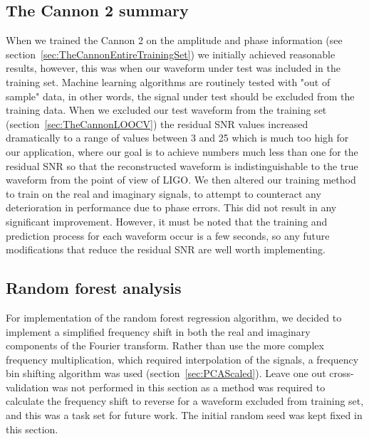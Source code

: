 \subsection{The Cannon 2 summary}
When we trained the Cannon 2 on the amplitude and phase information (see section~\ref{sec:TheCannonEntireTrainingSet}) we initially achieved reasonable results, however, this was when our waveform under test was included in the training set. Machine learning algorithms are routinely tested with "out of sample" data, in other words, the signal under test should be excluded from the training data. When we excluded our test waveform from the training set (section~\ref{sec:TheCannonLOOCV}) the residual SNR values increased dramatically to a range of values between 3 and 25 which is much too high for our application, where our goal is to achieve numbers much less than one for the residual SNR so that the reconstructed waveform is indistinguishable to the true waveform from the point of view of LIGO. We then altered our training method to train on the real and imaginary signals, to attempt to counteract any deterioration in performance due to phase errors. This did not result in any significant improvement. However, it must be noted that the training and prediction process for each waveform occur is a few seconds, so any future modifications that reduce the residual SNR are well worth implementing. 
\pagebreak
\subsection{Random forest analysis}
\label{sec:RandomForest}
For implementation of the random forest regression algorithm, we decided to implement a simplified frequency shift in both the real and imaginary components of the Fourier transform. Rather than use the more complex frequency multiplication, which required interpolation of the signals,  a frequency bin shifting algorithm was used (section~\ref{sec:PCAScaled}). Leave one out cross-validation was not performed in this section  as a method was required to calculate the frequency shift to reverse for a waveform excluded from training set, and this was a task set for future work.  The initial random seed was kept fixed in this section. 
